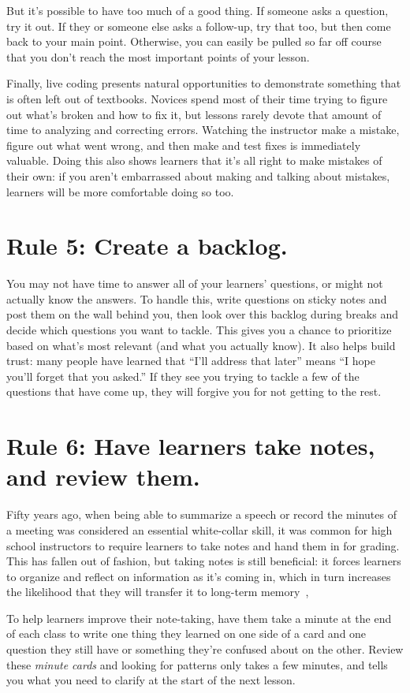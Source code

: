 \documentclass[10pt,letterpaper]{article}
\newcommand{\rulemajor}[1]{\section{#1}}
\begin{document}
But it's possible to have too much of a good thing.
If someone asks a question, try it out.
If they or someone else asks a follow-up,
try that too,
but then come back to your main point.
Otherwise,
you can easily be pulled so far off course that
you don't reach the most important points of your lesson.

Finally,
live coding presents natural opportunities to demonstrate something that is often left out of textbooks.
Novices spend most of their time trying to figure out what's broken and how to fix it,
but lessons rarely devote that amount of time to analyzing and correcting errors.
Watching the instructor make a mistake,
figure out what went wrong,
and then make and test fixes is immediately valuable.
Doing this also shows learners that it's all right to make mistakes of their own:
if you aren't embarrassed about making and talking about mistakes,
learners will be more comfortable doing so too.

\rulemajor{Rule 5: Create a backlog.}

You may not have time to answer all of your learners' questions,
or might not actually know the answers.
To handle this,
write questions on sticky notes and post them on the wall behind you,
then look over this backlog during breaks and decide which questions you want to tackle.
This gives you a chance to prioritize based on what's most relevant (and what you actually know).
It also helps build trust:
many people have learned that ``I'll address that later''
means ``I hope you'll forget that you asked.''
If they see you trying to tackle a few of the questions that have come up,
they will forgive you for not getting to the rest.

\rulemajor{Rule 6: Have learners take notes, and review them.}

Fifty years ago,
when being able to summarize a speech or record the minutes of a meeting
was considered an essential white-collar skill,
it was common for high school instructors to require learners to take notes
and hand them in for grading.
This has fallen out of fashion,
but taking notes is still beneficial:
it forces learners to organize and reflect on information as it's coming in,
which in turn increases the likelihood that they will transfer it to long-term memory~\cite{Aike1975,Boha2011},

To help learners improve their note-taking,
have them take a minute at the end of each class
to write one thing they learned on one side of a card
and one question they still have or something they're confused about on the other.
Review these \emph{minute cards} and looking for patterns only takes a few minutes,
and tells you what you need to clarify at the start of the next lesson.
\end{document}
